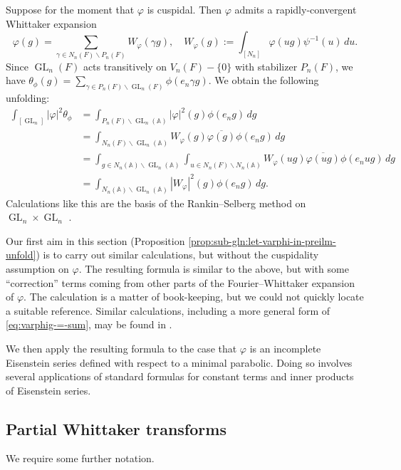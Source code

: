 \documentclass[reqno]{amsart}
\DeclareMathOperator{\GL}{GL}
\theoremstyle{plain} \newtheorem{theorem} {Theorem}
\theoremstyle{definition} \newtheorem{definition} [theorem] {Definition}
\theoremstyle{itplain} %
\numberwithin{equation}{section}
\numberwithin{theorem}{section}
\begin{document}
Suppose for the moment that $\varphi$ is cuspidal.  Then $\varphi$ admits a rapidly-convergent Whittaker expansion \cite[Thm 5.9]{MR348047} 
\begin{equation}\label{eq:varphig-=-sum}
  \varphi(g) = \sum _{\gamma \in N_n(F) \backslash P_n(F) } W_{\varphi}(\gamma g),
  \quad
  W_{\varphi}(g) := \int _{[N_n]}
  \varphi(u g) \psi^{-1}(u) \, d u.
\end{equation}
Since $\GL_n(F)$ acts transitively on $V_n(F) - \{0\}$ with stabilizer $P_n(F)$, we have $\theta_\phi(g) = \sum _{\gamma \in P_n(F) \backslash \GL_n(F)} \phi(e_n \gamma g)$.  We obtain the following unfolding:
\begin{align*}
  \int _{[\GL_n]} |\varphi|^2 \theta_\phi  &= 
  \int _{P_n(F) \backslash \GL_n(\mathbb{A})}|\varphi|^2(g) \phi(e_n g) \, d g \\
  &=
  \int _{N_n(F) \backslash \GL_n(\mathbb{A})} W_{\varphi}(g) \overline{\varphi(g)} \phi(e_n g) \, d g \\
  &=
    \int _{g \in N_n(\mathbb{A}) \backslash \GL_n(\mathbb{A})}
    \int _{u \in N_n(F) \backslash N_n(\mathbb{A})}
    W_{\varphi}(u g) \overline{\varphi(u g)} \phi(e_n u g) \, d g \\
  &=
  \int _{N_n(\mathbb{A}) \backslash \GL_n(\mathbb{A})} |W_{\varphi}|^2(g) \phi(e_n g) \, d g.
\end{align*}
Calculations like this are the basis of the Rankin--Selberg method on $\GL_n \times \GL_n$ \cite{MR701565, MR618323}.

Our first aim in this section (Proposition \ref{prop:sub-gln:let-varphi-in-preilm-unfold}) is to carry out similar calculations, but without the cuspidality assumption on $\varphi$.  The resulting formula is similar to the above, but with some ``correction'' terms coming from other parts of the Fourier--Whittaker expansion of $\varphi$.  The calculation is a matter of book-keeping, but we could not quickly locate a suitable reference.  Similar calculations, including a more general form of \eqref{eq:varphig-=-sum}, may be found in \cite[Prop 4.2]{MR3334892}.

We then apply the resulting formula to the case that $\varphi$ is an incomplete Eisenstein series defined with respect to a minimal parabolic.  Doing so involves several applications of standard formulas for constant terms and inner products of Eisenstein series.

\subsection{Partial Whittaker transforms}\label{sec:part-whitt-transf}
We require some further notation.
\end{document}
